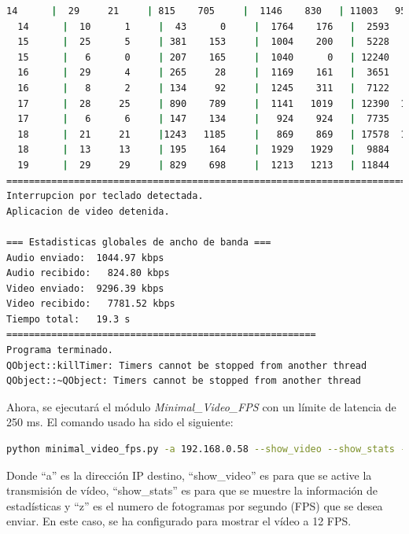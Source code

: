 \begin{lstlisting}[language=bash,basicstyle=\ttfamily\scriptsize]
  14      |  29     21     | 815    705     |  1146    830   | 11003   9516   |  36     66
  14      |  10      1     |  43      0     |  1764    176   |  2593      0   |  16     67
  15      |  25      5     | 381    153     |  1004    200   |  5228   2099   |  34     69
  15      |   6      0     | 207    165     |  1040      0   | 12240   9763   |  47     68
  16      |  29      4     | 265     28     |  1169    161   |  3651    386   |  38     69
  16      |   8      2     | 134     92     |  1245    311   |  7122   4886   |  33     70
  17      |  28     25     | 890    789     |  1141   1019   | 12390  10988   |  33     70
  17      |   6      6     | 147    134     |   924    924   |  7735   7050   |  18     71
  18      |  21     21     |1243   1185     |   869    869   | 17578  16756   |  30     70
  18      |  13     13     | 195    164     |  1929   1929   |  9884   8311   |  13     71
  19      |  29     29     | 829    698     |  1213   1213   | 11844   9970   |  35     72
============================================================================================
Interrupcion por teclado detectada.
Aplicacion de video detenida.

=== Estadisticas globales de ancho de banda ===
Audio enviado:	1044.97 kbps
Audio recibido:   824.80 kbps
Video enviado:	9296.39 kbps
Video recibido:   7781.52 kbps
Tiempo total: 	19.3 s
=======================================================
Programa terminado.
QObject::killTimer: Timers cannot be stopped from another thread
QObject::~QObject: Timers cannot be stopped from another thread
\end{lstlisting}
\vspace{\baselineskip}

\newpage

Ahora, se ejecutará el módulo \textit{Minimal\_Video\_FPS} con un límite de latencia de 250 ms. El comando usado ha sido el siguiente:

\begin{lstlisting}[language=bash, basicstyle=\ttfamily\scriptsize]
    python minimal_video_fps.py -a 192.168.0.58 --show_video --show_stats -z 12
\end{lstlisting}
Donde ``a'' es la dirección IP destino, ``show\_video'' es para que se active la transmisión de vídeo, ``show\_stats'' es para que se muestre la información de estadísticas y ``z'' es el numero de fotogramas por segundo (FPS) que se desea enviar. En este caso, se ha configurado para mostrar el vídeo a 12 FPS.
\vspace{\baselineskip}

